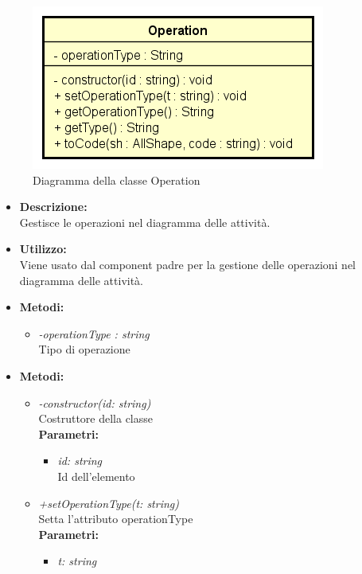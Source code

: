 \begin{figure}[h!]
	\centering
	\includegraphics[scale=0.8]{res/sections/SpecificaFrontEnd/Services/Disegnetti/operation.png}
	\caption{Diagramma della classe Operation}
\end{figure}

\begin{itemize}
	\item \textbf{Descrizione:}\\
	Gestisce le operazioni nel diagramma delle attività.
	\item \textbf{Utilizzo:}\\
	Viene usato dal component padre per la gestione delle operazioni nel diagramma delle attività.
	\item \textbf{Metodi:}
		\begin{itemize}
			\item \emph{-operationType : string}\\
    		Tipo di operazione
		\end{itemize}
	\item \textbf{Metodi:}
		\begin{itemize}
			\item \emph{-constructor(id: string)}\\
    		Costruttore della classe\\
    		\textbf{Parametri:}
    		\begin{itemize}
    			\item \emph{id: string}\\
    			Id dell'elemento
    		\end{itemize}
    		\item \emph{+setOperationType(t: string)}\\
    		Setta l'attributo operationType\\
    		\textbf{Parametri:}
    		\begin{itemize}
    			\item \emph{t: string}\\

\end{itemize}
\end{itemize}
\end{itemize}
